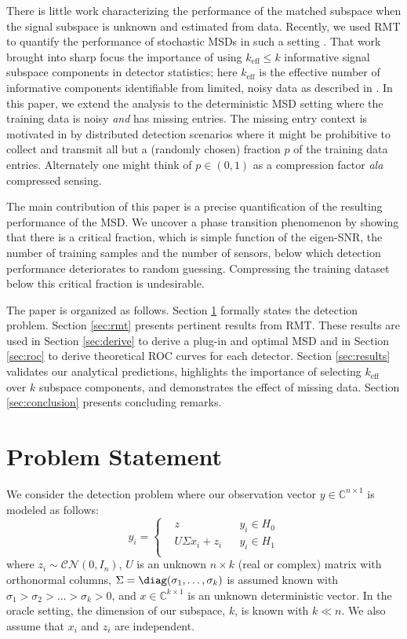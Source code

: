 There is little work characterizing the performance of the matched subspace when the signal subspace is unknown and estimated from data. Recently, we used RMT to quantify the performance of stochastic MSDs in such a setting  \cite{asendorf2011msd}. That work brought into sharp focus the importance of using $k_\text{eff}\leq k$ informative signal subspace components in detector statistics; here $k_{\text{eff}}$ is the effective number of informative components identifiable from limited, noisy data as described in \cite{nadakuditi2008sample}. In this paper, we extend the analysis to the deterministic MSD setting where the training data is noisy \textit{and} has missing entries. The missing entry context is motivated in \cite{balzano2010high} by distributed detection scenarios where it might be prohibitive to collect and transmit all but a (randomly chosen) fraction $p$ of the training data entries. Alternately one might think of $p \in (0,1)$ as a compression factor \textit{ala} compressed sensing. 

The main contribution of this paper is a precise quantification of the resulting performance of the MSD. We uncover a phase transition phenomenon by showing that there is a critical fraction, which is simple function of the eigen-SNR, the number of training samples and the number of sensors, below which detection performance deteriorates to random guessing. Compressing the training dataset below this critical fraction is undesirable.

The paper is organized as follows. Section \ref{sec:prob stat} formally states the detection problem. Section \ref{sec:rmt} presents pertinent results from RMT. These results are used in Section \ref{sec:derive} to derive a plug-in and optimal MSD and in Section \ref{sec:roc} to derive theoretical ROC curves for each detector. Section \ref{sec:results} validates our analytical predictions, highlights the importance of selecting $k_\text{eff}$ over $k$ subspace components, and demonstrates the effect of missing data. Section \ref{sec:conclusion} presents concluding remarks.

\section{Problem Statement}\label{sec:prob stat}

We consider the detection problem where our observation vector $y \in \mathbb{C}^{n \times 1}$ is modeled as follows:
\begin{equation}\label{eq:problem}
y_i=\left\{
\begin{aligned}
&z
&& y_i\in H_0\\
&U\Sigma x_i+z_i
&& y_i\in H_1\\
\end{aligned}\right.
\end{equation}
where $z_i\sim\mathcal{CN}(0,I_n)$, $U$ is an unknown $n\times k$ (real or complex) matrix with orthonormal columns, $\Sigma=\diag(\sigma_1,\dots,\sigma_k)$ is assumed known with $\sigma_1>\sigma_2>\dots>\sigma_k>0$, and $x\in\mathbb{C}^{k\times 1}$ is an unknown deterministic vector. In the oracle setting, the dimension of our subspace, $k$, is known with $k\ll n$. We also assume that $x_i$ and $z_i$ are independent.

